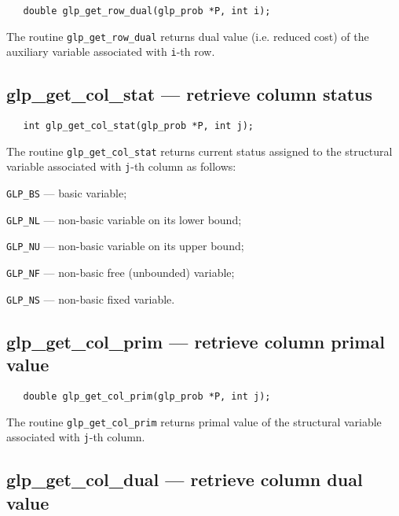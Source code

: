 \synopsis

\begin{verbatim}
   double glp_get_row_dual(glp_prob *P, int i);
\end{verbatim}

\returns

The routine \verb|glp_get_row_dual| returns dual value (i.e. reduced
cost) of the auxiliary variable associated with \verb|i|-th row.

\subsection{glp\_get\_col\_stat --- retrieve column status}

\synopsis

\begin{verbatim}
   int glp_get_col_stat(glp_prob *P, int j);
\end{verbatim}

\returns

The routine \verb|glp_get_col_stat| returns current status assigned to
the structural variable associated with \verb|j|-th column as follows:

\verb|GLP_BS| --- basic variable;

\verb|GLP_NL| --- non-basic variable on its lower bound;

\verb|GLP_NU| --- non-basic variable on its upper bound;

\verb|GLP_NF| --- non-basic free (unbounded) variable;

\verb|GLP_NS| --- non-basic fixed variable.

\subsection{glp\_get\_col\_prim --- retrieve column primal value}

\synopsis

\begin{verbatim}
   double glp_get_col_prim(glp_prob *P, int j);
\end{verbatim}

\returns

The routine \verb|glp_get_col_prim| returns primal value of the
structural variable associated with \verb|j|-th column.


\subsection{glp\_get\_col\_dual --- retrieve column dual value}

